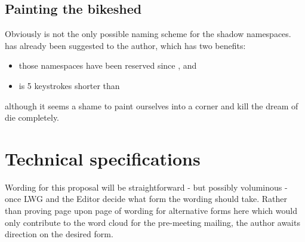 \section{Painting the bikeshed}
Obviously  is not the only possible naming scheme for the
shadow namespaces.  has already been suggested to the author,
which has two benefits:
\begin{itemize}
\item those namespaces have been reserved since , and
\item {} is 5 keystrokes shorter than
\end{itemize}
although it seems a shame to paint ourselves into a corner and kill the dream
of  die completely.


\chapter{Technical specifications}
Wording for this proposal will be straightforward - but possibly voluminous -
once LWG and the Editor decide what form the wording should take. Rather than
proving page upon page of wording for alternative forms here which would only
contribute to the word cloud for the pre-meeting mailing, the author awaits
direction on the desired form.

